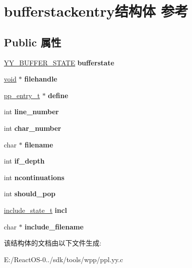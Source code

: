 \hypertarget{structbufferstackentry}{}\section{bufferstackentry结构体 参考}
\label{structbufferstackentry}
\subsection*{Public 属性}
\begin{DoxyCompactItemize}
\item 
\mbox{\label{structbufferstackentry_a6b947e9c05d0b024ed094e5f4eda7369}} 
\hyperlink{structyy__buffer__state}{Y\+Y\+\_\+\+B\+U\+F\+F\+E\+R\+\_\+\+S\+T\+A\+TE} {\bfseries bufferstate}
\item 
\mbox{\label{structbufferstackentry_a3ed8de3169da3885d1c212cf247e4500}} 
\hyperlink{interfacevoid}{void} $\ast$ {\bfseries filehandle}
\item 
\mbox{\label{structbufferstackentry_a2e8d811e8dcbf8b91850961d5f1f692c}} 
\hyperlink{structpp__entry}{pp\+\_\+entry\+\_\+t} $\ast$ {\bfseries define}
\item 
\mbox{\label{structbufferstackentry_a7f14e03527fcf8dd4a33783ac224e280}} 
int {\bfseries line\+\_\+number}
\item 
\mbox{\label{structbufferstackentry_a4015869d5c026576e09d66dde8e4a09c}} 
int {\bfseries char\+\_\+number}
\item 
\mbox{\label{structbufferstackentry_a2c0155508c7c8f915986ca000ebcf247}} 
char $\ast$ {\bfseries filename}
\item 
\mbox{\label{structbufferstackentry_aa3ddfdd59c5c413b7db52875d2c378ff}} 
int {\bfseries if\+\_\+depth}
\item 
\mbox{\label{structbufferstackentry_ac97267d2fbab3ea4f0152068a68e76f0}} 
int {\bfseries ncontinuations}
\item 
\mbox{\label{structbufferstackentry_ad95b414e18384997639ae378f342aa05}} 
int {\bfseries should\+\_\+pop}
\item 
\mbox{\label{structbufferstackentry_a34bd4cfdeda5bd3997c8ecfc3c516a0c}} 
\hyperlink{structinclude__state__t}{include\+\_\+state\+\_\+t} {\bfseries incl}
\item 
\mbox{\label{structbufferstackentry_a57e5a91ad125526816da5d89ed1df622}} 
char $\ast$ {\bfseries include\+\_\+filename}
\end{DoxyCompactItemize}


该结构体的文档由以下文件生成\+:\begin{DoxyCompactItemize}
\item 
E\+:/\+React\+O\+S-\/0../sdk/tools/wpp/ppl.\+yy.\+c\end{DoxyCompactItemize}
